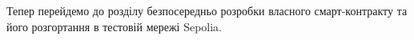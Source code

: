 Тепер перейдемо до розділу безпосередньо розробки власного смарт-контракту та його розгортання в тестовій мережі Sepolia.



